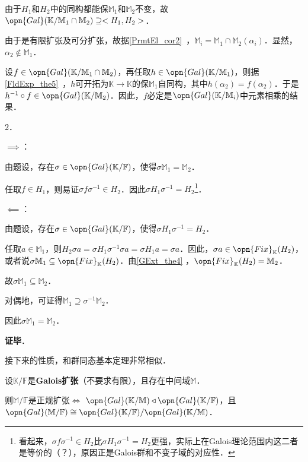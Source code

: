 由于$H_1$和$H_2$中的同构都能保$\mathbb{M}_1$和$\mathbb{M}_2$不变，故$\opn{Gal}(\mathbb{K}/\mathbb{M}_1\cap\mathbb{M}_2)\supseteq<H_1, H_2>$．

由于是有限扩张及可分扩张，故据\autoref{PrmtEl_cor2}~，$\mathbb{M}_i=\mathbb{M}_1\cap\mathbb{M}_2(\alpha_i)$．显然，$\alpha_2\not\in\mathbb{M}_1$．

设$f\in\opn{Gal}(\mathbb{K}/\mathbb{M}_1\cap\mathbb{M}_2)$，再任取$h\in\opn{Gal}(\mathbb{K}/\mathbb{M}_1)$，则据\autoref{FldExp_the5}~，$h$可开拓为$\mathbb{K}\to\mathbb{K}$的保$\mathbb{M}_1$自同构，其中$h(\alpha_2)=f(\alpha_2)$．于是$h^{-1}\circ f\in\opn{Gal}(\mathbb{K}/\mathbb{M}_2)$．因此，$f$必定是$\opn{Gal}(\mathbb{K}/\mathbb{M}_i)$中元素相乘的结果．

2．

$\implies$：

由题设，存在$\sigma\in\opn{Gal}(\mathbb{K}/\mathbb{F})$，使得$\sigma \mathbb{M}_1=\mathbb{M}_2$．

任取$f\in H_1$，则易证$\sigma f\sigma^{-1}\in H_2$．因此$\sigma H_1\sigma^{-1}=H_2$\footnote{看起来，$\sigma f\sigma^{-1}\in H_2$比$\sigma H_1\sigma^{-1}=H_2$更强，实际上在Galois理论范围内这二者是等价的（？），原因正是Galois群和不变子域的对应性．}．

$\impliedby$：

由题设，存在$\sigma\in\opn{Gal}(\mathbb{K}/\mathbb{F})$，使得$\sigma H_1\sigma^{-1}=H_2$．

任取$a\in\mathbb{M}_{1}$，则$H_2 \sigma a=\sigma H_1\sigma^{-1}\sigma a=\sigma H_1 a=\sigma a$．因此，$\sigma a\in\opn{Fix}_\mathbb{K}(H_2)$，或者说$\sigma\mathbb{M}_1\subseteq\opn{Fix}_\mathbb{K}(H_2)$．由\autoref{GExt_the4} ，$\opn{Fix}_\mathbb{K}(H_2)=\mathbb{M}_2$．

故$\sigma\mathbb{M}_1\subseteq\mathbb{M}_2$．

对偶地，可证得$\mathbb{M}_1\supseteq\sigma^{-1}\mathbb{M}_2$．

因此$\sigma\mathbb{M}_1=\mathbb{M}_2$．




\textbf{证毕}．




接下来的性质，和群同态基本定理非常相似．

\begin{theorem}{}\label{GExt_the8}
设$\mathbb{K}/\mathbb{F}$是\textbf{Galois扩张}（不要求有限），且存在中间域$\mathbb{M}$．

则$\mathbb{M}/\mathbb{F}$是正规扩张$\iff$ $\opn{Gal}(\mathbb{K/\mathbb{M}})\triangleleft\opn{Gal}(\mathbb{K/\mathbb{F}})$，且$\opn{Gal}(\mathbb{M}/\mathbb{F})\cong \opn{Gal}(\mathbb{K}/\mathbb{F})/\opn{Gal}(\mathbb{K}/\mathbb{M})$．
\end{theorem}

